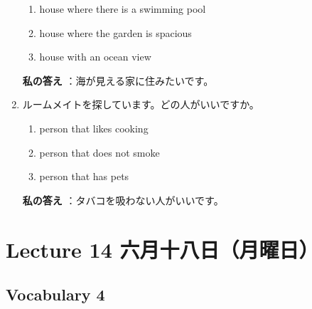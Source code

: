 \documentclass[notoc,notitlepage]{tufte-book}
\begin{document}
\begin{ex}
\begin{enumerate}
      \begin{enumerate}
        \item house where there is a swimming pool
        \item house where the garden is spacious
        \item house with an ocean view
      \end{enumerate}
      \textbf{私の答え} ：海が見える家に住みたいです。
    \item ルームメイトを探しています。どの人がいいですか。\\
      \begin{enumerate}
        \item person that likes cooking
        \item person that does not smoke
        \item person that has pets
      \end{enumerate}
      \textbf{私の答え} ：タバコを吸わない人がいいです。
  \end{enumerate}
\end{ex}



\chapter{Lecture 14 六月十八日（月曜日）}%
\label{chp:lecture_14_liu_yue_shi_ba_ri_yue_yao_ri_}

\section{Vocabulary 4}%
\label{sec:vocabulary_4}
\end{document}
